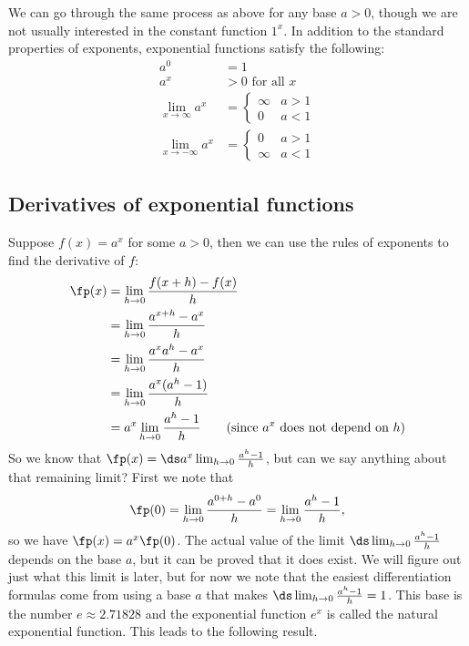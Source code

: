 We can go through the same process as above for any base $a>0$, though we are not usually interested in the constant function $1^x$. In addition to the standard properties of exponents, exponential functions satisfy the following:
\begin{align*}
 a^0 &= 1 \\
 a^x &>0 \text{ for all $x$} \\
 \lim_{x\to\infty}a^x &=\begin{cases}\infty&a>1\\0&a<1\end{cases}\\
 \lim_{x\to-\infty}a^x &=\begin{cases}0&a>1\\\infty&a<1\end{cases}
\end{align*}

\subsection*{Derivatives of exponential functions}

Suppose $f(x)=a^x$ for some $a>0$, then we can use the rules of exponents to find the derivative of $f$:
\begin{align*}
	\fp(x)
	&=\lim_{h\to 0}\frac{f(x+h)-f(x)}{h}\\
	&=\lim_{h\to 0}\frac{a^{x+h}-a^x}{h}\\
	&=\lim_{h\to 0}\frac{a^xa^h-a^x}{h}\\
	&=\lim_{h\to 0}\frac{a^x(a^h-1)}{h}\\
	&=a^x\lim_{h\to 0}\frac{a^h-1}{h} \qquad\text{(since $a^x$ does not depend on $h$)}\\
\end{align*}
So we know that $\fp(x)=\ds a^x \lim_{h\to 0}\frac{a^h-1}{h}$, but can we say anything about that remaining limit? First we note that
\[\fp(0)=\lim_{h\to 0}\frac  {a^{0+h}-a^0}{h}=\lim_{h\to 0}\frac{a^h-1}{h},\]
so we have $\fp(x)=a^x\fp(0)$. The actual value of the limit $\ds\lim_{h\to 0}\frac{a^h-1}{h}$ depends on the base $a$, but it can be proved that it does exist. We will figure out just what this limit is later, but for now we note that the easiest differentiation formulas come from using a base $a$ that makes $\ds\lim_{h\to 0}\frac{a^h-1}{h}=1$. This base is the number $e\approx 2.71828$ and the exponential function $e^x$ is called the natural exponential function. This leads to the following result.


